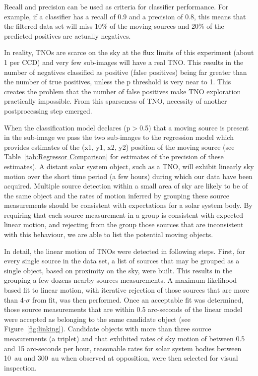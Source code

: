 \documentclass{aastex631}
\begin{document}
Recall and precision can be used as criteria for classifier performance.
For example, if a classifier has a recall of 0.9 and a precision of 0.8, this means that the filtered data set will miss 10\% of the moving sources and 20\% of the predicted positives are actually negatives.

In reality, TNOs are scarce on the sky at the flux limits of this experiment (about 1 per CCD) and very few sub-images will have a real TNO. 
This results in the number of negatives classified as positive (false positives) being far greater than the number of true positives, unless the p threshold is very near to 1. 
This creates the problem that the number of false positives make TNO exploration practically impossible. 
From this sparseness of TNO, necessity of another postprocessing step emerged.

When the classification model declares (p$>$0.5) that a moving source is present in the sub-image we pass the two sub-images to the regression model which provides estimates of the (x1, y1, x2, y2) position of the moving source (see Table~\ref{tab:Regressor Comparison} for estimates of the precision of these estimates).
A distant solar system object, such as a TNO, will exhibit linearly sky motion over the short time period (a few hours) during which our data have been acquired. 
Multiple source detection within a small area of sky are likely to be of the same object and the rates of motion inferred by grouping these source measurements should be consistent with expectations for a solar system body. 
By requiring that each source measurement in a group is consistent with expected linear motion, and rejecting from the group those sources that are inconsistent with this behaviour, we are able to list the potential moving objects.

In detail, the linear motion of TNOs were detected in following steps.
First, for every single source in the data set, a list of sources that may be grouped as a single object, based on proximity on the sky, were built.
This results in the grouping a few dozens nearby sources measurements.
A maximum-likelihood based fit to linear motion, with iterative rejection of those sources that are more than 4-$\sigma$ from fit, was then performed.
Once an acceptable fit was determined, those source measurements that are within 0.5 arc-seconds of the linear model were accepted as belonging to the same candidate object (see Figure~\ref{fig:linking}).
Candidate objects with more than three source measurements (a triplet) and that exhibited rates of sky motion of between 0.5 and 15 arc-seconds per hour, reasonable rates for solar system bodies between 10~au and 300~au when observed at opposition, were then selected for visual inspection.
\end{document}
